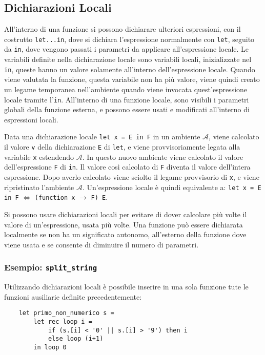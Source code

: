 \documentclass{article}
\numberwithin{equation}{subsection}
\begin{document}
\subsection{Dichiarazioni Locali}

All'interno di una funzione si possono dichiarare ulteriori espressioni, con il costrutto \verb|let...in|, dove si dichiara l'espressione normalmente con \verb|let|, seguito da \verb|in|, dove vengono passati i parametri da applicare all'espressione locale. Le variabili definite nella dichiarazione locale sono variabili locali, inizializzate nel \verb|in|, queste hanno un valore solamente all'interno dell'espressione locale. Quando viene valutata la funzione, questa variabile non ha più valore, viene quindi creato un legame temporanea nell'ambiente quando viene invocata quest'espressione locale tramite l'\verb|in|. All'interno di una funzione locale, sono visibili i parametri globali della funzione esterna, e possono essere usati e modificati all'interno di espressioni locali. 

Data una dichiarazione locale \verb|let x = E in F| in un ambiente $\mathscr{A}$, viene calcolato il valore \verb|v| della dichiarazione \verb|E| di \verb|let|, e viene provvisoriamente legata alla variabile \verb|x| estendendo $\mathscr{A}$. In questo nuovo ambiente viene calcolato il valore dell'espressione \verb|F| di \verb|in|. Il valore così calcolato di \verb|F| diventa il valore dell'intera espressione. Dopo averlo calcolato viene sciolto il legame provvisorio di \verb|x|, e viene ripristinato l'ambiente $\mathscr{A}$. Un'espressione locale è quindi equivalente a: \verb|let x = E in F| $\Leftrightarrow$ \verb|(function x| $\rightarrow$ \verb|F) E|. 

Si possono usare dichiarazioni locali per evitare di dover calcolare più volte il valore di un'espressione, usata più volte. 
Una funzione può essere dichiarata localmente se non ha un significato autonomo, all'esterno della funzione dove viene usata e se consente di diminuire il numero di parametri. 

\subsubsection*{Esempio: \texttt{split\_string}}

Utilizzando dichiarazioni locali è possibile inserire in una sola funzione tute le funzioni ausiliarie definite precedentemente:
\begin{verbatim}
    let primo_non_numerico s =
        let rec loop i = 
            if (s.[i] < '0' || s.[i] > '9') then i
            else loop (i+1)
        in loop 0
\end{verbatim}
\end{document}
